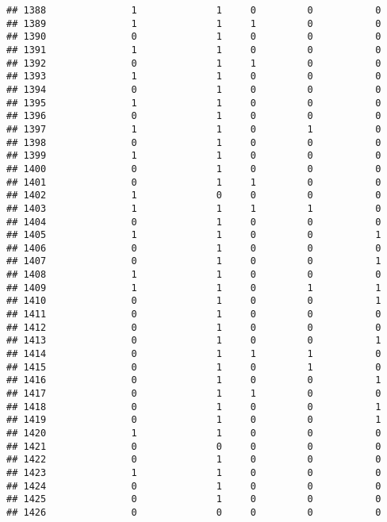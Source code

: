\documentclass[]{article}
\begin{document}
\begin{verbatim}
## 1388               1              1     0         0           0
## 1389               1              1     1         0           0
## 1390               0              1     0         0           0
## 1391               1              1     0         0           0
## 1392               0              1     1         0           0
## 1393               1              1     0         0           0
## 1394               0              1     0         0           0
## 1395               1              1     0         0           0
## 1396               0              1     0         0           0
## 1397               1              1     0         1           0
## 1398               0              1     0         0           0
## 1399               1              1     0         0           0
## 1400               0              1     0         0           0
## 1401               0              1     1         0           0
## 1402               1              0     0         0           0
## 1403               1              1     1         1           0
## 1404               0              1     0         0           0
## 1405               1              1     0         0           1
## 1406               0              1     0         0           0
## 1407               0              1     0         0           1
## 1408               1              1     0         0           0
## 1409               1              1     0         1           1
## 1410               0              1     0         0           1
## 1411               0              1     0         0           0
## 1412               0              1     0         0           0
## 1413               0              1     0         0           1
## 1414               0              1     1         1           0
## 1415               0              1     0         1           0
## 1416               0              1     0         0           1
## 1417               0              1     1         0           0
## 1418               0              1     0         0           1
## 1419               0              1     0         0           1
## 1420               1              1     0         0           0
## 1421               0              0     0         0           0
## 1422               0              1     0         0           0
## 1423               1              1     0         0           0
## 1424               0              1     0         0           0
## 1425               0              1     0         0           0
## 1426               0              0     0         0           0

\end{verbatim}
\end{document}
